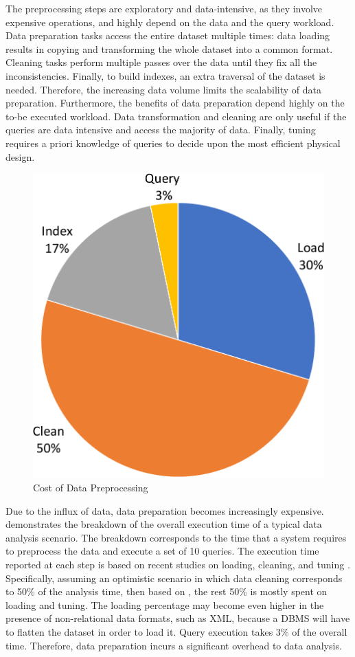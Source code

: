 The preprocessing steps are exploratory and data-intensive, as they involve expensive operations, and highly depend on the data and the query workload. Data preparation tasks access the entire dataset multiple times: data loading results in copying and transforming the whole dataset into a common format. Cleaning tasks perform multiple passes over the data until they fix all the inconsistencies. Finally, to build indexes, an extra  traversal of the dataset is needed. Therefore, the increasing 
data volume limits the scalability of data preparation.
%
Furthermore,  the benefits of data preparation depend highly on the 
to-be executed workload. Data transformation and cleaning are only 
useful if the queries are data intensive and access the majority of 
data. Finally, tuning requires a priori knowledge of queries to decide 
upon the most efficient physical design.


\begin{figure}
	\includegraphics[width=0.34\columnwidth]{figs/breakdown_pie}	
	\caption{Cost of Data Preprocessing}
	\label{fig:preprocessing}
\end{figure}

Due to the influx of data, data preparation becomes increasingly 
expensive. ~ demonstrates the breakdown of
the overall execution time of a typical data analysis scenario.
The breakdown corresponds to the time that a system requires to 
preprocess the data and execute a set of 10 queries. The execution 
time reported at 
each step is based on recent studies on loading, cleaning, and tuning 
\cite{buckley_new_2012,Olma2017a}.
Specifically, assuming an optimistic scenario in which data cleaning
corresponds to 50\% of the analysis time, then based on \cite{Olma2017a},
the rest 50\% 
is mostly spent on loading and tuning. The loading percentage may become even higher 
in the presence of non-relational data formats, such 
as XML, because a DBMS will have to flatten the dataset in order to 
load it. Query execution takes 3\% of the overall time. Therefore, 
data preparation incurs a significant overhead to data analysis.

